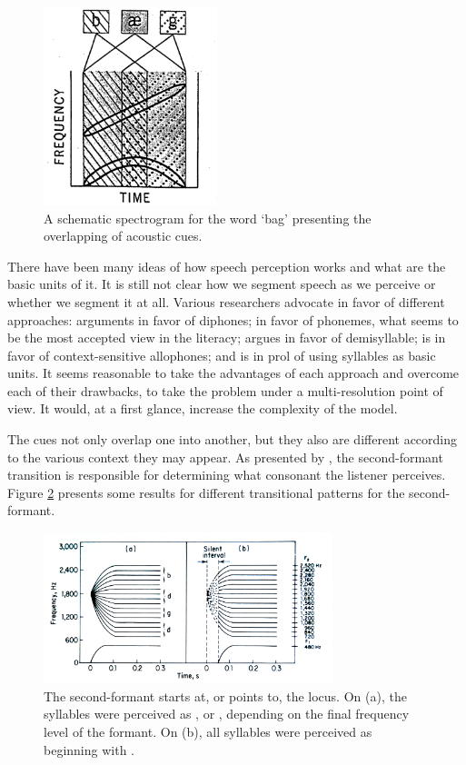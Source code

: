 \begin{figure}[h!]
\centering
\includegraphics[width=0.45\textwidth]{images/liberman.png}
\caption{A schematic spectrogram for the word `bag' presenting the overlapping of acoustic cues. \citep{liberman1970}}
\label{fig:liberman}
\end{figure}  

There have been many ideas of how speech perception works and what are the basic units of it. It is still not clear how we segment speech as we perceive or whether we segment it at all. Various researchers advocate in favor of different approaches: \cite{klatt1979} arguments in favor of diphones; \cite{pisoni1982} in favor of phonemes, what seems to be the most accepted view in the literacy; \cite{fujimura1978} argues in favor of demisyllable; \cite{wickelgren1969} is in favor of context-sensitive allophones; and \cite{studdert1976} is in prol of using syllables as basic units. It seems reasonable to take the advantages of each approach and overcome each of their drawbacks, to take the problem under a multi-resolution point of view. It would, at a first glance, increase the complexity of the model.


The cues not only overlap one into another, but they also are different according to the various context they may appear. As presented by \cite{liberman1967}, the second-formant transition is responsible for determining what consonant the listener perceives. Figure \ref{fig:liberman2} presents some results for different transitional patterns for the second-formant.

\begin{figure}[h!]
\centering
\includegraphics[width=0.75\textwidth]{images/liberman2.png}
\caption{The second-formant starts at, or points to, the  locus. On (a), the syllables were perceived as ,  or , depending on the final frequency level of the formant. On (b), all syllables were perceived as beginning with . \citep{liberman1967}}
\label{fig:liberman2}
\end{figure} 
